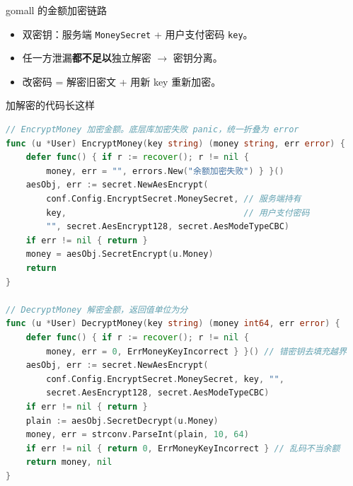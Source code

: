 \documentclass[aspectratio=169,11pt]{beamer}
\begin{document}
\begin{frame}[shrink]{gomall 的金额加密链路}
\vspace{1mm}
\begin{itemize}
  \item 双密钥：服务端 \texttt{MoneySecret} + 用户支付密码 \texttt{key}。
  \item 任一方泄漏\textbf{都不足以}独立解密 $\to$ 密钥分离。
  \item 改密码 = 解密旧密文 + 用新 key 重新加密。
\end{itemize}
\end{frame}

\begin{frame}{加解密的代码长这样}
\begin{lstlisting}[language=Go,firstnumber=64,
  caption={}]
// EncryptMoney 加密金额。底层库加密失败 panic，统一折叠为 error
func (u *User) EncryptMoney(key string) (money string, err error) {
    defer func() { if r := recover(); r != nil {
        money, err = "", errors.New("余额加密失败") } }()
    aesObj, err := secret.NewAesEncrypt(
        conf.Config.EncryptSecret.MoneySecret, // 服务端持有
        key,                                   // 用户支付密码
        "", secret.AesEncrypt128, secret.AesModeTypeCBC)
    if err != nil { return }
    money = aesObj.SecretEncrypt(u.Money)
    return
}

// DecryptMoney 解密金额，返回值单位为分
func (u *User) DecryptMoney(key string) (money int64, err error) {
    defer func() { if r := recover(); r != nil {
        money, err = 0, ErrMoneyKeyIncorrect } }() // 错密钥去填充越界
    aesObj, err := secret.NewAesEncrypt(
        conf.Config.EncryptSecret.MoneySecret, key, "",
        secret.AesEncrypt128, secret.AesModeTypeCBC)
    if err != nil { return }
    plain := aesObj.SecretDecrypt(u.Money)
    money, err = strconv.ParseInt(plain, 10, 64)
    if err != nil { return 0, ErrMoneyKeyIncorrect } // 乱码不当余额
    return money, nil
}
\end{lstlisting}
\end{frame}
\end{document}
